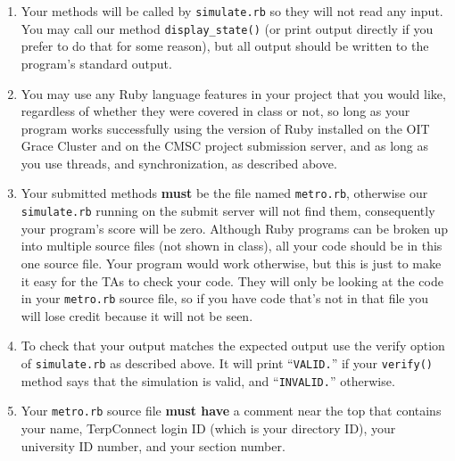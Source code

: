 \documentclass[11pt]{article}
\begin{document}
    \begin{enumerate}

      \addtolength{\itemsep}{-1mm}

      \item Your methods will be called by \texttt{simulate.rb} so they will
            not read any input.  You may call our method
            \texttt{display\_state()} (or print output directly if you
            prefer to do that for some reason), but all output should be
            written to the program's standard output.

      \item You may use any Ruby language features in your project that you
            would like, regardless of whether they were covered in class or
            not, so long as your program works successfully using the
            version of Ruby installed on the OIT Grace Cluster and on the
            CMSC project submission server, and as long as you use threads,
            and synchronization, as described above.

      \item Your submitted methods \textbf{must} be the file named
            \texttt{metro.rb}, otherwise our \texttt{simulate.rb}
            running on the submit server will not find them, consequently
            your program's score will be zero.  Although Ruby programs can
            be broken up into multiple source files (not shown in class),
            all your code should be in this one source file.  Your program
            would work otherwise, but this is just to make it easy for the
            TAs to check your code.  They will only be looking at the code
            in your \texttt{metro.rb} source file, so if you have code
            that's not in that file you will lose credit because it will not
            be seen.

      \item To check that your output matches the expected output use the
            verify option of \texttt{simulate.rb} as described above.  It
            will print ``\texttt{VALID.}'' if your \texttt{verify()} method
            says that the simulation is valid, and ``\texttt{INVALID.}''
            otherwise.

      \item Your \texttt{metro.rb} source file \textbf{must have} a comment
            near the top that contains your name, TerpConnect login ID
            (which is your directory ID), your university ID number, and
            your section number.


\end{enumerate}
\end{document}
